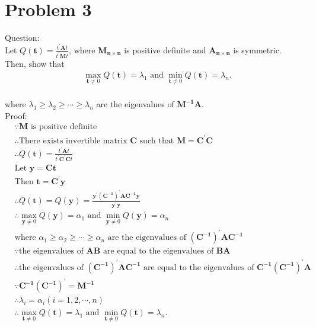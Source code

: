 \documentclass{article}
\begin{document}
\section{Problem 3}
Question:\\
Let $Q(\bm{t})=\frac{t^{\prime}\bm{A}t}{t^{\prime}\bm{M}t}$, where
$\bm{M_{n\times n}}$ is positive definite and $\bm{A_{n\times n}}$ is
symmetric. Then, show that\\
\begin{align*}
  &\max_{\bm{t}\neq 0}Q(\bm{t})=\lambda_1 \text{ and }\min_{\bm{t}\neq 0}Q(\bm{t})=\lambda_n
  .
  \end{align*}\\
where $\lambda_1\geq \lambda_2 \geq \cdots \geq \lambda_n$ are the
eigenvalues of $\bm{M^{-1}A}$.\\
Proof:\\
\begin{align*}
  &\because \bm{M} \text{ is positive definite}\\
  &\therefore \text{There exists invertible matrix }\bm{C} \text{ such
    that }\bm{M}=\bm{C^{\prime}C}\\
  &\therefore Q(\bm{t})=\frac{t^{\prime}\bm{A}t}{t^{\prime}\bm{C^{\prime}C}t}\\
  &\text{Let }\bm{y}=\bm{Ct}\\
  &\text{Then }\bm{t}=\bm{C^{\prime}y}\\
  &\therefore Q(\bm{t})=Q(\bm{y})=\frac{\bm{y^{\prime}}(\bm{C^{-1}})^{\prime}\bm{A}\bm{C^{-1}y}}{\bm{y^{\prime}y}}\\
  &\therefore \max_{\bm{y}\neq 0}Q(\bm{y})=\alpha_1 \text{ and }\min_{\bm{y}\neq 0}Q(\bm{y})=\alpha_n\\
  &  \text{where }\alpha_1\geq \alpha_2 \geq \cdots \geq \alpha_n
  \text{ are the eigenvalues of }
(\bm{C^{-1}})^{\prime}\bm{A}\bm{C^{-1}}\\
&\because \text{the eigenvalues of }\bm{AB} \text{ are equal to the
  eigenvalues of }\bm{BA}\\
&\therefore \text{the eigenvalues of }(\bm{C^{-1}})^{\prime}\bm{A}\bm{C^{-1}} \text{ are equal to the
  eigenvalues of }\bm{C^{-1}} (\bm{C^{-1}})^{\prime}\bm{A}\\
  &\because \bm{C^{-1}} (\bm{C^{-1}})^{\prime}=\bm{M^{-1}}\\
  &\therefore \lambda_{i}=\alpha_i (i=1,2,\cdots,n)\\
  &\therefore \max_{\bm{t}\neq 0}Q(\bm{t})=\lambda_1 \text{ and }\min_{\bm{t}\neq 0}Q(\bm{t})=\lambda_n
  .
  \end{align*}
\end{document}
